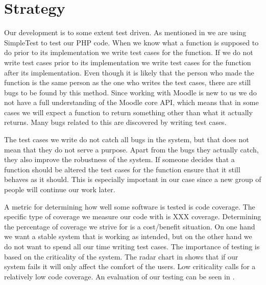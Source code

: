 \section{Strategy}
\label{sec:strategy}
\newcommand{\idealCC}{\todo{make this correct}XXX}
Our development is to some extent test driven.
As mentioned in  we are using SimpleTest to test our PHP code.
When we know what a function is supposed to do prior to its implementation we write test cases for the function.
If we do not write test cases prior to its implementation we write test cases for the function after its implementation.
Even though it is likely that the person who made the function is the same person as the one who writes the test cases, there are still bugs to be found by this method.
Since working with Moodle is new to us we do not have a full understanding of the Moodle core API, which means that in some cases we will expect a function to return something other than what it actually returns.
Many bugs related to this are discovered by writing test cases.

The test cases we write do not catch all bugs in the system, but that does not mean that they do not serve a purpose.
Apart from the bugs they actually catch, they also improve the robustness of the system.
If someone decides that a function should be altered the test cases for the function ensure that it still behaves as it should.
This is especially important in our case since a new group of people will continue our work later.

A metric for determining how well some software is tested is code coverage. 
The specific type of coverage we measure our code with is \idealCC{} coverage. 
Determining the percentage of coverage we strive for is a cost/benefit situation.
On one hand we want a stable system that is working as intended, but on the other hand we do not want to spend all our time writing test cases.
The importance of testing is based on the criticality of the system.
The radar chart in  shows that if our system fails it will only affect the comfort of the users.
Low criticality calls for a relatively low code coverage.
An evaluation of our testing can be seen in .

